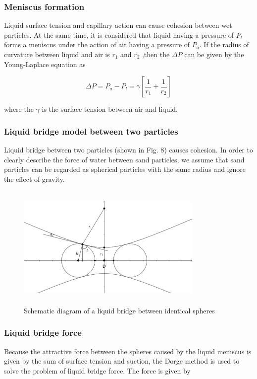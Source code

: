 \documentclass[13pt]{ctexart}
\begin{document}
	\subsubsection{Meniscus formation}
	Liquid surface tension and capillary action can cause cohesion between wet particles\cite{MitaraiWet}. At the same time, it is considered that  liquid having a pressure of $P_l$ forms a meniscus under the action of air having a pressure of $P_a$. If the radius of curvature between liquid and air is $r_{1}$ and $r_{2}$ ,then the $\Delta P$ can be given by the Young-Laplace equation as
	
	\begin{equation}
	\Delta P = P_{a} - P_{l} = \gamma[\frac{1}{r_{1}}+\frac{1}{r_{2}}]
	\end{equation}
	
	where the $\gamma$ is the surface tension between air and liquid.
	
	\subsubsection{Liquid bridge model between two particles}
	Liquid bridge between two particles (shown in Fig. 8) causes cohesion\cite{MuAnalysis}. In order to clearly describe the force of water between sand particles, we assume that sand particles can be regarded as spherical particles with the same radius and ignore the effect of gravity.
	
	\begin{figure}[htb]
		\centering %
		\includegraphics[width=9cm,height=6cm]{bridge.png}
		\caption{Schematic diagram of a liquid bridge between identical spheres} %
	\end{figure}
	
	\subsubsection{Liquid bridge force}
	Because the attractive force between the spheres caused by the liquid meniscus is given by the sum of surface tension and suction\cite{MitaraiWet}, the Dorge method is used to solve the problem of liquid bridge force. The force is given by
	
\end{document}

